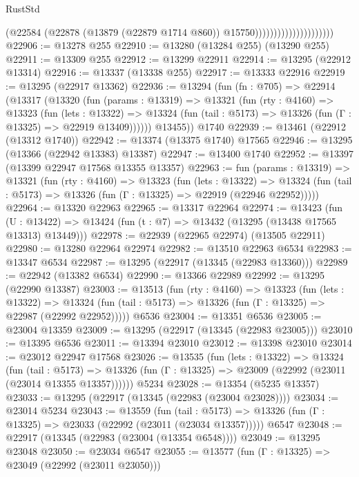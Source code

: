 \begin{lexlean}{RustStd}
\begin{coremodule}
                                          (@22584
                                            (@22878
                                              (@13879 (@22879 @1714 @860))
                                              @15750)))))))))))))))))))))
@22906 := @13278 @255
@22910 := @13280 (@13284 @255) (@13290 @255)
@22911 := @13309 @255
@22912 := @13299 @22911
@22914 := @13295 (@22912 @13314)
@22916 := @13337 (@13338 @255)
@22917 := @13333 @22916
@22919 := @13295 (@22917 @13362)
@22936 := @13294
    (fun (fn : @705) =>
    @22914
      (@13317
        (@13320
          (fun (params : @13319) =>
          @13321
            (fun (rty : @4160) =>
            @13323
              (fun (lets : @13322) =>
              @13324 (fun (tail : @5173) => @13326 (fun (Γ : @13325) => @22919 @13409))))))
        @13455))
    @1740
@22939 := @13461 (@22912 (@13312 @1740))
@22942 := @13374 (@13375 @1740) @17565
@22946 := @13295 (@13366 (@22942 @13383) @13387)
@22947 := @13400 @1740
@22952 := @13397 (@13399 @22947 @17568 @13355 @13357)
@22963 := fun (params : @13319) =>
  @13321
    (fun (rty : @4160) =>
    @13323
      (fun (lets : @13322) =>
      @13324 (fun (tail : @5173) => @13326 (fun (Γ : @13325) => @22919 (@22946 @22952)))))
@22964 := @13320 @22963
@22965 := @13317 @22964
@22974 := @13423
    (fun (U : @13422) => @13424 (fun (t : @7) => @13432 (@13295 (@13438 @17565 @13313) @13449)))
@22978 := @22939 (@22965 @22974) (@13505 @22911)
@22980 := @13280 @22964 @22974
@22982 := @13510 @22963 @6534
@22983 := @13347 @6534
@22987 := @13295 (@22917 (@13345 (@22983 @13360)))
@22989 := @22942 (@13382 @6534)
@22990 := @13366 @22989
@22992 := @13295 (@22990 @13387)
@23003 := @13513
    (fun (rty : @4160) =>
    @13323
      (fun (lets : @13322) =>
      @13324 (fun (tail : @5173) => @13326 (fun (Γ : @13325) => @22987 (@22992 @22952)))))
    @6536
@23004 := @13351 @6536
@23005 := @23004 @13359
@23009 := @13295 (@22917 (@13345 (@22983 @23005)))
@23010 := @13395 @6536
@23011 := @13394 @23010
@23012 := @13398 @23010
@23014 := @23012 @22947 @17568
@23026 := @13535
    (fun (lets : @13322) =>
    @13324
      (fun (tail : @5173) =>
      @13326 (fun (Γ : @13325) => @23009 (@22992 (@23011 (@23014 @13355 @13357))))))
    @5234
@23028 := @13354 (@5235 @13357)
@23033 := @13295 (@22917 (@13345 (@22983 (@23004 @23028))))
@23034 := @23014 @5234
@23043 := @13559
    (fun (tail : @5173) => @13326 (fun (Γ : @13325) => @23033 (@22992 (@23011 (@23034 @13357)))))
    @6547
@23048 := @22917 (@13345 (@22983 (@23004 (@13354 @6548))))
@23049 := @13295 @23048
@23050 := @23034 @6547
@23055 := @13577 (fun (Γ : @13325) => @23049 (@22992 (@23011 @23050)))

\end{coremodule}
\end{lexlean}
